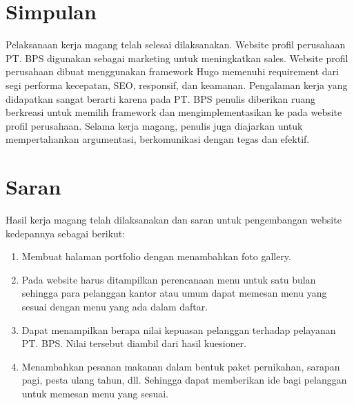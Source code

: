 
\section{Simpulan}

Pelaksanaan kerja magang telah selesai dilaksanakan. Website profil perusahaan 
PT. BPS digunakan sebagai marketing untuk meningkatkan sales. Website profil 
perusahaan dibuat menggunakan framework Hugo memenuhi requirement dari segi performa kecepatan, 
SEO, responsif, dan keamanan. Pengalaman kerja yang didapatkan sangat berarti karena pada 
PT. BPS penulis diberikan ruang berkreasi untuk memilih 
framework dan mengimplementasikan ke pada website profil perusahaan. Selama kerja magang, 
penulis juga diajarkan untuk mempertahankan argumentasi, berkomunikasi dengan tegas dan efektif.

\section{Saran}
Hasil kerja magang telah dilaksanakan dan saran untuk pengembangan website kedepannya sebagai berikut:
\begin{enumerate}[label=(\alph*)]
\item Membuat halaman portfolio dengan menambahkan foto gallery.
\item Pada website harus ditampilkan perencanaan menu untuk satu bulan sehingga para 
pelanggan kantor atau umum dapat memesan menu yang sesuai dengan menu yang ada dalam daftar.
\item Dapat menampilkan berapa nilai kepuasan pelanggan terhadap pelayanan PT. BPS. 
Nilai tersebut diambil dari hasil kuesioner.
\item Menambahkan pesanan makanan dalam bentuk paket pernikahan, sarapan pagi, 
pesta ulang tahun, dll. Sehingga dapat memberikan ide bagi pelanggan untuk memesan menu yang sesuai.
\end{enumerate}